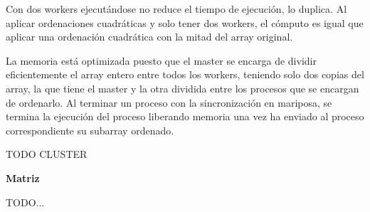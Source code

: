 Con dos workers ejecutándose no reduce el tiempo de ejecución, lo duplica. Al aplicar ordenaciones cuadráticas y solo tener dos workers, el cómputo es igual que aplicar una ordenación cuadrática con la mitad del array original.

La memoria está optimizada puesto que el master se encarga de dividir eficientemente el array entero entre todos los workers, teniendo solo dos copias del array, la que tiene el master y la otra dividida entre los procesos que se encargan de ordenarlo. Al terminar un proceso con la sincronización en mariposa, se termina la ejecución del proceso liberando memoria una vez ha enviado al proceso correspondiente su subarray ordenado.


\color{blue} TODO CLUSTER

\color{black}
\newpage


\begin{flushleft}
	\textbf{Matriz}
\end{flushleft}

\color{blue} TODO...

\color{black}


\newpage


